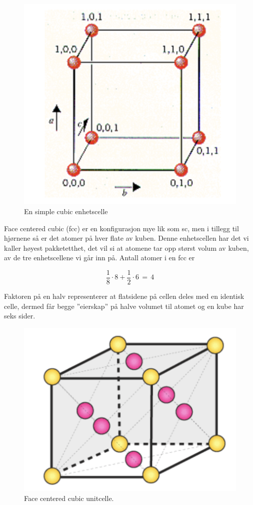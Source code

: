 \begin{figure}[!htb]
    \centering
    \includegraphics[scale=0.8]{Bilder/SamtaleTema4/sc.png}
    \caption{En simple cubic enhetscelle}
    \label{fig:sc}
\end{figure}
\newpage
Face centered cubic (fcc) er en konfigurasjon mye lik som sc, men i tillegg til hjørnene så er det atomer på hver flate av kuben. Denne enhetscellen har det vi kaller høyest pakketetthet, det vil si at atomene tar opp størst volum av kuben, av de tre enhetscellene vi går inn på. Antall atomer i en fcc er 

\begin{equation*}
    \frac{1}{8} \cdot 8 + \frac{1}{2}\cdot 6 \,= \,4
\end{equation*}

Faktoren på en halv representerer at flatsidene på cellen deles med en identisk celle, dermed får begge ''eierskap'' på halve volumet til atomet og en kube har seks sider.

\begin{figure}[!htb]
    \centering
    \includegraphics[scale=0.5]{Bilder/SamtaleTema4/fcc.png}
    \caption{Face centered cubic unitcelle.}
    \label{fig:fcc}
\end{figure}

